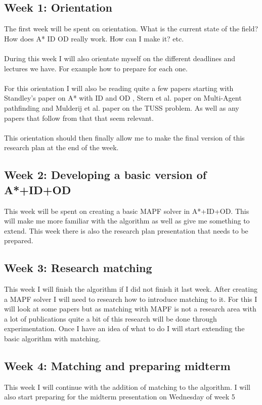 \documentclass[english]{article}
\begin{document}
\subsection*{Week 1: Orientation}
The first week will be spent on orientation. What is the current state of the field?  How does A* ID OD really work. How can I make it? etc.
\\\\
During this week I will also orientate myself on the different deadlines and lectures we have. For example how to prepare for each one.
\\\\
For this orientation I will also be reading quite a few papers starting with Standley's paper on A* with ID and OD \cite{AStarIDOD_standley_2010}, Stern et al. paper on Multi-Agent pathfinding\cite{stern2019multiagent} and Mulderij et al. paper on the TUSS problem\cite{mulderij2020train}. As well as any papers that follow from that that seem relevant.
\\\\
This orientation should then finally allow me to make the final version of this research plan at the end of the week.

\subsection*{Week 2: Developing a basic version of A*+ID+OD}
This week will be spent on creating a basic MAPF solver in A*+ID+OD. This will make me more familiar with the algorithm as well as give me something to extend. This week there is also the research plan presentation that needs to be prepared.

\subsection*{Week 3: Research matching}
This week I will finish the algorithm if I did not finish it last week. 
After creating a MAPF solver I will need to research how to introduce matching to it. 
For this I will look at some papers but as matching with MAPF is not a research area with a lot of publications quite a bit of this research will be done through experimentation.
Once I have an idea of what to do I will start extending the basic algorithm with matching.

\subsection*{Week 4: Matching and preparing midterm}
This week I will continue with the addition of matching to the algorithm. I will also start preparing for the midterm presentation on Wednesday of week 5
\end{document}
